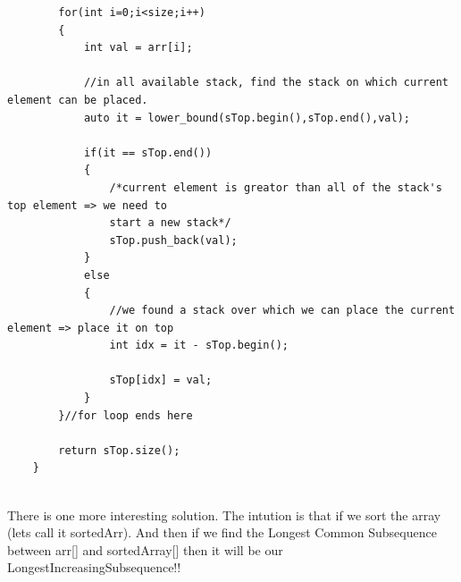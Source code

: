 \begin{solution}
\begin{verbatim}
        for(int i=0;i<size;i++)
        {
            int val = arr[i];
            
            //in all available stack, find the stack on which current element can be placed. 
            auto it = lower_bound(sTop.begin(),sTop.end(),val); 

            if(it == sTop.end())
            {
                /*current element is greator than all of the stack's top element => we need to 
                start a new stack*/
                sTop.push_back(val);
            }
            else
            {
                //we found a stack over which we can place the current element => place it on top
                int idx = it - sTop.begin();
            
                sTop[idx] = val; 
            }
        }//for loop ends here
        
        return sTop.size();
    }
    
    \end{verbatim}
\end{solution}

\begin{solution}
    There is one more interesting solution.
    The intution is that if we sort the array (lets call it sortedArr). And then if we find the Longest Common Subsequence
    between arr[] and sortedArray[] then it will be our LongestIncreasingSubsequence!!
\end{solution}

